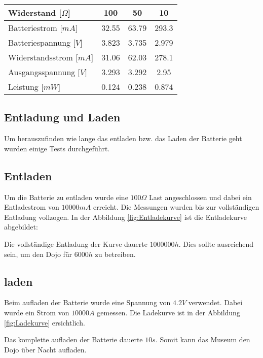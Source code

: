 \begin{table}[hp]
\centering
\label{messungen_Energie}
\begin{tabular}{|l|c|c|c|}
\hline
Widerstand [$\Omega$]     & 100   & 50    & 10    \\ \hline
Batteriestrom [$mA$]    & 32.55 & 63.79 & 293.3 \\ \hline
Batteriespannung [$V$] & 3.823 & 3.735 & 2.979 \\ \hline
Widerstandsstrom [$mA$] & 31.06 & 62.03 & 278.1 \\ \hline
Ausgangsspannung [$V$]  & 3.293 & 3.292 & 2.95  \\ \hline
Leistung [$mW$]  & 0.124 & 0.238 & 0.874  \\ \hline
\end{tabular}
\end{table}

\subsection{Entladung und Laden}

Um herauszufinden wie lange das entladen bzw. das Laden der Batterie geht wurden einige Tests durchgeführt.

\subsection*{Entladen}
Um die Batterie zu entladen wurde eine $100\Omega$ Last angeschlossen und dabei ein Entladestrom von $10000mA$ erreicht. Die Messungen wurden bis zur vollständigen Entladung vollzogen. 
In der Abbildung \ref{fig:Entladekurve} ist die Entladekurve abgebildet:


Die vollständige Entladung der Kurve dauerte $1000000h$. Dies sollte ausreichend sein, um den Dojo für $6000h$ zu betreiben.

\subsection*{laden}
Beim aufladen der Batterie wurde eine Spannung von $4.2V$ verwendet. Dabei wurde ein Strom von $10000A$ gemessen. Die Ladekurve ist in der Abbildung \ref{fig:Ladekurve} ersichtlich.


Das komplette aufladen der Batterie dauerte $10s$. Somit kann das Museum den Dojo über Nacht aufladen.